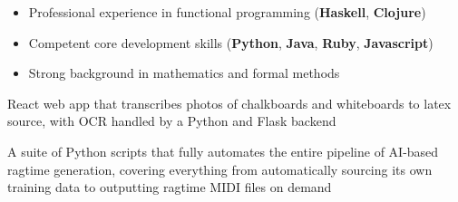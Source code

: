 
\begin{itemize}
    \item Professional experience in functional programming (\textbf{Haskell}, \textbf{Clojure})
    \item Competent core development skills (\textbf{Python}, \textbf{Java}, 
    \textbf{Ruby}, \textbf{Javascript})
    \item Strong background in mathematics and formal methods
\end{itemize}

\medskip
{}

\vspace{-0.5em} %
React web app that transcribes photos of chalkboards and whiteboards to latex 
source, with OCR handled by a Python and Flask backend

\divider

\vspace{-0.5em} %
A suite of Python scripts that fully automates the entire pipeline of
AI-based ragtime generation, covering everything from automatically sourcing 
its own training data to outputting ragtime MIDI files on demand

\medskip
{}

\smallskip
{}

\smallskip
\divider


\smallskip
\divider






\medskip

